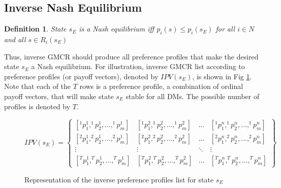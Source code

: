 \documentclass[letterpaper,12pt,titlepage,oneside,final]{book}
\newtheorem{theorem}[lemma]{Theorem}
\newtheorem{definition}[lemma]{Definition}
\begin{document}
\subsection{Inverse Nash Equilibrium}
\begin{definition}
\rm
\label{def:nash_inv1}
State $s_E$ is a Nash equilibrium \emph{iff} $p_i(s)\leq p_i(s_E)$ for all $i \in N$ and all $s \in R_i(s_E)$


\end{definition}



Thus, inverse GMCR should produce all preference profiles that make the desired state $s_E$ a Nash equilibrium. For illustration, inverse GMCR list according to preference profiles (or payoff vectors), denoted by $IPV(s_E)$, is shown in Fig \ref{fig:IPVil}. Note that each of the $T$ rows is a preference profile, a combination of ordinal payoff vectors, that will make state $s_E$ stable for all DMs. The possible number of profiles is denoted by $T$. %

\begin{center}
\begin{figure}
\centering


$IPV(s_E)= \begin{Bmatrix}
[^1p_1^1,^1p_2^1, \dots ,^1p_m^1 ] & [^1p_1^2,^1p_2^2, \dots ,^1p_m^2 ] & \dots & [^1p_1^n,^1p_2^n, \dots ,^1p_m^n ] \\ 
[^2p_1^1,^2p_2^1, \dots ,^2p_m^1 ] & [^2p_1^2,^2p_2^2, \dots ,^2p_m^2 ] & \dots & [^2p_1^n,^2p_2^n, \dots ,^2p_m^n ] \\ 
\vdots  & \vdots  & \ddots  & \vdots \\ 
[^Tp_1^1,^Tp_2^1, \dots ,^Tp_m^1 ] & [^Tp_1^2,^Tp_2^2, \dots ,^Tp_m^2 ] & \dots & [^Tp_1^n,^Tp_2^n, \dots ,^Tp_m^n ]
\end{Bmatrix} $


\caption{Representation of the inverse preference profiles list for state $s_E$}

\label{fig:IPVil}
\end{figure}
\end{center}
\end{document}
